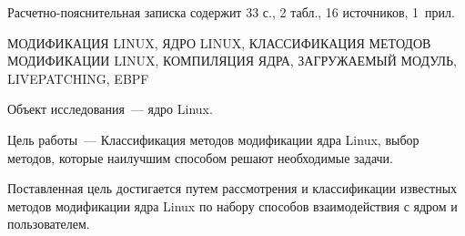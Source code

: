 


    

    \normalsize

    \setcounter{page}{2}

    Расчетно-пояснительная записка содержит 33 с., 2 табл., 16 источников, 1~прил.

    МОДИФИКАЦИЯ LINUX, ЯДРО LINUX, КЛАССИФИКАЦИЯ МЕТОДОВ МОДИФИКАЦИИ LINUX, КОМПИЛЯЦИЯ ЯДРА, ЗАГРУЖАЕМЫЙ МОДУЛЬ, LIVEPATCHING, EBPF

    Объект исследования~--- ядро Linux.

    Цель работы~--- Классификация методов модификации ядра Linux, выбор методов, которые наилучшим способом решают необходимые задачи.

    Поставленная цель достигается путем рассмотрения и классификации известных методов модификации ядра Linux по набору способов взаимодействия с ядром и пользователем.
    \pagebreak
    \renewcommand{\contentsname}{\normalsize\bfseries\centering СОДЕРЖАНИЕ}
    \tableofcontents
    \normalsize

    \pagebreak

    
    

    
    
    
    

    

    




